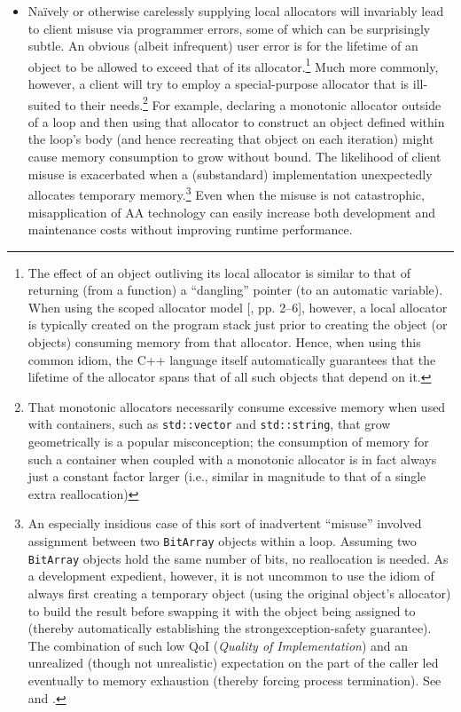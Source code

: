 \begin{itemize}
\item Naïvely or otherwise carelessly supplying local allocators will invariably lead to
client misuse via programmer errors, some of which can be surprisingly
subtle. An obvious (albeit infrequent) user error is for the lifetime of an object
to be allowed to exceed that of its allocator.\footnote{The effect of an object outliving its local allocator is similar to that of returning (from a function) a
“dangling” pointer (to an automatic variable). When using the scoped allocator model [\cite{halpern08}, pp.
2–6], however, a local allocator is typically created on the program stack just prior to creating the
object (or objects) consuming memory from that allocator. Hence, when using this common idiom, the
C++ language itself automatically guarantees that the lifetime of the allocator spans that of all such
objects that depend on it.} Much more commonly, however,
a client will try to employ a special-purpose allocator that is ill-suited to their
needs.\footnote{That monotonic allocators necessarily consume excessive memory when used with containers, such
as \lstinline{std::vector} and \lstinline{std::string}, that grow geometrically is a popular misconception; the
consumption of memory for such a container when coupled with a monotonic allocator is in fact
always just a constant factor larger (i.e., similar in magnitude to that of a single extra reallocation)}
For example, declaring a monotonic allocator outside of a loop and
then using that allocator to construct an object defined within the loop’s body
(and hence recreating that object on each iteration) might cause memory
consumption to grow without bound. The likelihood of client misuse is
exacerbated when a (substandard) implementation unexpectedly allocates
temporary memory.\footnote{An especially insidious case of this sort of inadvertent “misuse” involved assignment between two
\lstinline{BitArray} objects within a loop. Assuming two \lstinline{BitArray} objects hold the same number of bits, no
reallocation is needed. As a development expedient, however, it is not uncommon to use the idiom of
always first creating a temporary object (using the original object’s allocator) to build the result before
swapping it with the object being assigned to (thereby automatically establishing the strongexception-safety
guarantee). The combination of such low QoI (\emph{Quality of Implementation}) and an
unrealized (though not unrealistic) expectation on the part of the caller led eventually to memory
exhaustion (thereby forcing process termination). See \cite{halpern20a} and \cite{halpern20b}.} Even
when the misuse is not catastrophic,
misapplication of AA technology can easily increase both development and
maintenance costs without improving runtime performance.


\end{itemize}
